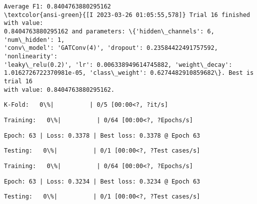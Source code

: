 \documentclass[11pt]{article}
\begin{document}
    
    \begin{Verbatim}[commandchars=\\\{\}]
Average F1: 0.8404763880295162
\textcolor{ansi-green}{[I 2023-03-26 01:05:55,578]} Trial 16 finished with value:
0.8404763880295162 and parameters: \{'hidden\_channels': 6, 'num\_hidden': 1,
'conv\_model': 'GATConv(4)', 'dropout': 0.23584422491757592, 'nonlinearity':
'leaky\_relu(0.2)', 'lr': 0.006338949614745882, 'weight\_decay':
1.0162726722370981e-05, 'class\_weight': 0.6274482910859682\}. Best is trial 16
with value: 0.8404763880295162.
    \end{Verbatim}

    
    \begin{Verbatim}[commandchars=\\\{\}]
K-Fold:   0\%|          | 0/5 [00:00<?, ?it/s]
    \end{Verbatim}

    
    
    \begin{Verbatim}[commandchars=\\\{\}]
Training:   0\%|          | 0/64 [00:00<?, ?Epochs/s]
    \end{Verbatim}

    
    \begin{Verbatim}[commandchars=\\\{\}]
Epoch: 63 | Loss: 0.3378 | Best loss: 0.3378 @ Epoch 63
    \end{Verbatim}

    
    \begin{Verbatim}[commandchars=\\\{\}]
Testing:   0\%|          | 0/1 [00:00<?, ?Test cases/s]
    \end{Verbatim}

    
    
    \begin{Verbatim}[commandchars=\\\{\}]
Training:   0\%|          | 0/64 [00:00<?, ?Epochs/s]
    \end{Verbatim}

    
    \begin{Verbatim}[commandchars=\\\{\}]
Epoch: 63 | Loss: 0.3234 | Best loss: 0.3234 @ Epoch 63
    \end{Verbatim}

    
    \begin{Verbatim}[commandchars=\\\{\}]
Testing:   0\%|          | 0/1 [00:00<?, ?Test cases/s]
    \end{Verbatim}
\end{document}
